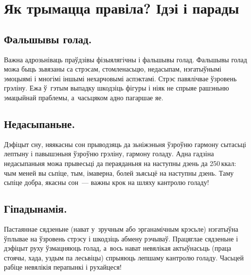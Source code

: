 
\section{Як трымацца правіла? Ідэі і парады}

\subsection{Фальшывы голад.}
Важна адрозьніваць праўдзівы фізыялягічны і фальшывы голад. Фальшывы голад можа быць зьвязаны са стрэсам, стомленасьцю, недасыпам, нэгатыўнымі эмоцыямі і многімі іншымі нехарчовымі аспэктамі. Стрэс павялічвае ўзровень грэліну. Ежа ў~гэтым выпадку шкодзіць фігуры і ніяк не спрыяе рашэньню эмацыйнай праблемы, а~часьцяком адно пагаршае яе.

\subsection{Недасыпаньне.}
Дэфіцыт сну, няякасны сон прыводзяць да зьніжэньня ўзроўню гармону сытасьці лептыну і павышэньня ўзроўню грэліну, гармону голаду. Адна гадзіна недасыпаньня можа прывесьці да пераяданьня на наступны дзень да 250\,ккал: чым меней вы сьпіце, тым, імаверна, болей зьясьцё на наступны дзень. Таму сьпіце добра, якасны сон~--- важны крок на шляху кантролю голаду!

\subsection{Гіпадынамія.}
Пастаяннае сядзеньне (нават у~зручным або эрганамічным крэсьле) нэгатыўна ўплывае на ўзровень стрэсу і шкодзіць абмену рэчываў. Працяглае сядзеньне і дэфіцыт руху ўзмацняюць голад, а~вось нават невялікая актыўнасьць (праца стоячы, хада, уздым па лесьвіцы) спрыяюць лепшаму кантролю голаду. Часьцей рабіце невялікія перапынкі і рухайцеся!


